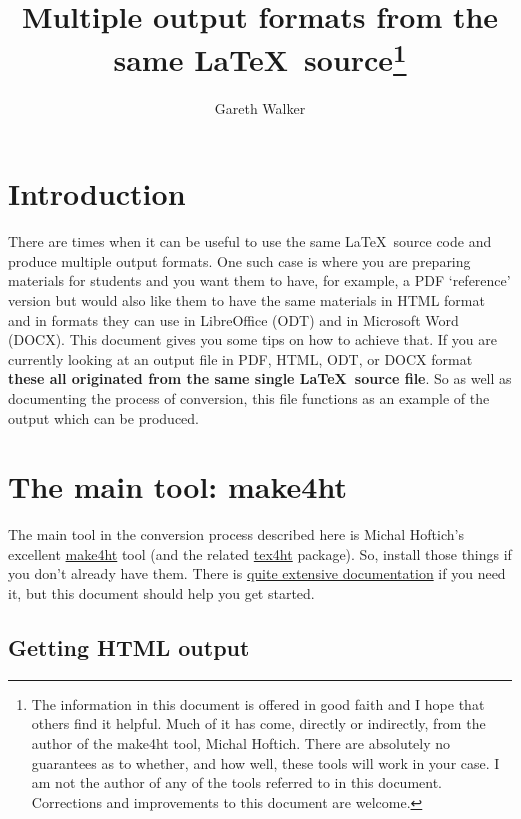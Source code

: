 \documentclass[a4paper,12pt]{article}
\begin{document}
\title{Multiple output formats from the same \LaTeX\ source\thanks{The
    information in this document is offered in good faith and I hope
    that others find it helpful.  Much of it has come, directly or
    indirectly, from the author of the make4ht tool, Michal Hoftich.
    There are absolutely no guarantees as to whether, and how well,
    these tools will work in your case. I am not the author of any of
    the tools referred to in this document.  Corrections and
    improvements to this document are welcome.}}  \author{Gareth
  Walker}
\maketitle
\tableofcontents

\section{Introduction}

There are times when it can be useful to use the same \LaTeX\ source
code and produce multiple output formats.  One such case is where you
are preparing materials for students and you want them to have, for
example, a PDF `reference' version but would also like them to have
the same materials in HTML format and in formats they can use in
LibreOffice (ODT) and in Microsoft Word (DOCX).  This document gives
you some tips on how to achieve that. If you are currently looking at
an output file in PDF, HTML, ODT, or DOCX format \textbf{these all
  originated from the same single \LaTeX\ source file}. So as well as
documenting the process of conversion, this file functions as an
example of the output which can be produced.

\section{The main tool: make4ht}

The main tool in the conversion process described here is Michal
Hoftich's excellent \href{https://ctan.org/pkg/make4ht}{make4ht} tool
(and the related \href{https://ctan.org/pkg/tex4ht}{tex4ht} package).
So, install those things if you don't already have them. There is
\href{https://www.kodymirus.cz/tex4ht-doc/tex4ht-doc.html}{quite
  extensive documentation} if you need it, but this document should
help you get started.

\subsection{Getting HTML output}
\end{document}

